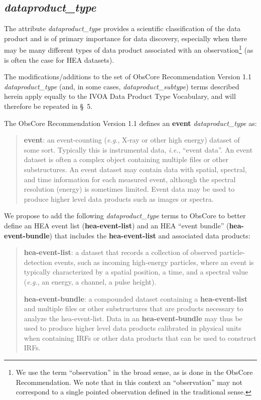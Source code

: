 \documentclass[11pt,a4paper]{ivoa}
\begin{document}
\subsection{{\em dataproduct\_type}}
\label{sec:dataproduct_type}

The attribute {\em dataproduct\_type\/} provides a scientific classification of the data product and is of primary importance for data discovery, especially when there may be many different types of data product associated with an observation\footnote{We use the term ``observation'' in the broad sense, as is done in the ObsCore Recommendation. We note that in this context an ``observation'' may not correspond to a single pointed observation defined in the traditional sense.} (as is often the case for \gls{HEA} datasets).

The modifications/additions to the set of ObsCore Recommendation Version 1.1 \citep{2017ivoa.spec.0509L} {\em dataproduct\_type\/} (and, in some cases, {\em dataproduct\_subtype\/}) terms described herein apply equally to the IVOA Data Product Type Vocabulary, and will therefore be repeated in \S~5.

The ObsCore Recommendation Version 1.1 \citep{2017ivoa.spec.0509L} defines an {\bf event} {\em dataproduct\_type\/} as:

\begin{quote}
{\bf event}: an event-counting ({\em e.g.\/}, X-ray or other high energy) dataset of some sort. Typically this is instrumental data, {\em i.e.\/}, ``event data''.  An event dataset is often a complex object containing multiple files or other substructures. An event dataset may contain data with spatial, spectral, and time information for each measured event, although the spectral resolution (energy) is sometimes limited. Event data may be used to produce higher level data products such as images or spectra.
\end{quote}

We propose to add the following {\em dataproduct\_type\/} terms to ObsCore to better define an \gls{HEA} event list ({\bf hea-event-list}) and an \gls{HEA} ``event bundle'' ({\bf hea-event-bundle}) that includes the {\bf hea-event-list} and associated data products:
\begin{quote}
{\bf hea-event-list}: a dataset that records a collection of observed particle-detection events, such as incoming high-energy particles, where an event is typically characterized by a spatial position, a time, and a spectral value ({\em e.g.\/}, an energy, a channel, a pulse height).

{\bf hea-event-bundle}: a compounded dataset containing a {\bf hea-event-list} and multiple files or other substructures that are products necessary to analyze the hea-event-list. Data in an {\bf hea-event-bundle} may thus be used to produce higher level data products calibrated in physical units when containing \glspl{IRF} or other data products that can be used to construct \glspl{IRF}.
\end{quote}
\end{document}
